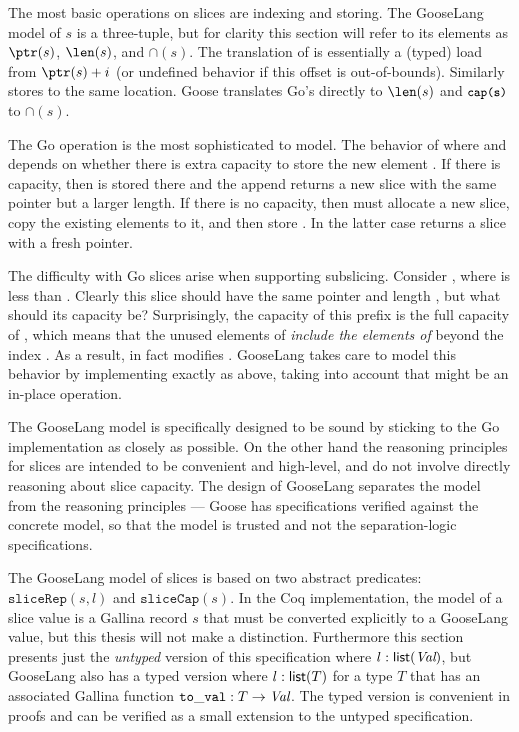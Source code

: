 
The most basic operations on slices are indexing and storing. The
GooseLang model of $s$ is a three-tuple, but for clarity this section will refer
to its elements as $\ptr(s)$, $\len(s)$, and $\cap(s)$. The
translation of  is essentially a (typed) load from
$\ptr(s) + i$ (or undefined behavior if this offset is out-of-bounds).
Similarly  stores to the same location. Goose translates Go's
 directly to $\len(s)$ and $\cc{cap(s)}$ to $\cap(s)$.

The Go  operation is the most sophisticated to model. The
behavior of  where  and
 depends on whether there is extra capacity to store the
new element . If there is capacity, then  is stored
there and the append returns a new slice with the same pointer but a
larger length. If there is no capacity, then  must
allocate a new slice, copy the existing elements to it, and then store
. In the latter case  returns a slice with a
fresh pointer.

The difficulty with Go slices arise when supporting subslicing. Consider
, where  is less than .
Clearly this slice should have the same pointer and length ,
but what should its capacity be? Surprisingly, the capacity of this
prefix is the full capacity of , which means that the unused
elements of  \emph{include the elements of }
beyond the index . As a result, 
in fact modifies . GooseLang takes care to model this
behavior by implementing  exactly as above, taking into
account that  might be an in-place operation.

The GooseLang model is specifically designed to be sound by sticking to
the Go implementation as closely as possible. On the other hand the reasoning principles
for slices are intended to be convenient and high-level, and do not involve
directly reasoning about slice capacity. The design of GooseLang separates the
model from the reasoning principles --- Goose has specifications verified against
the concrete model, so that the model is trusted and not the
separation-logic specifications.

\newcommand{\sliceRep}{\mathtt{sliceRep}}
\newcommand{\sliceCap}{\mathtt{sliceCap}}

The GooseLang model of slices is based on two abstract predicates:
$\sliceRep(s, l)$ and $\sliceCap(s)$. In the Coq implementation, the model of a slice value is
a Gallina record $s$ that must be converted explicitly to a GooseLang value, but
this thesis will not make a distinction. Furthermore this section presents just the
\emph{untyped} version of this specification where $l : \textsf{\upshape list}(\textit{Val})$, but
GooseLang also has a typed version where $l : \textsf{\upshape list}(T)$ for a type $T$
that has an associated Gallina function $\mathtt{to\_val} : T \to \textit{Val}$. The typed
version is convenient in proofs and can be verified as a small extension to the
untyped specification.

